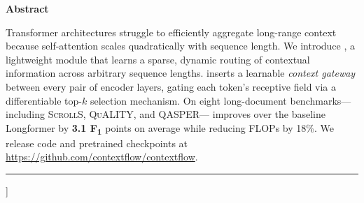 \documentclass[10pt,twocolumn]{article}
\begin{document}
{\begin{@twocolumnfalse}
  \vspace{8pt}
  \begin{center}
    {\small\bfseries\color{accent} Abstract}
  \end{center}
  \begin{small}
  \noindent
  Transformer architectures struggle to efficiently aggregate long-range context
  because self-attention scales quadratically with sequence length. We introduce
  \modelname{}, a lightweight module that learns a sparse, dynamic routing of
  contextual information across arbitrary sequence lengths. \modelname{} inserts
  a learnable \emph{context gateway} between every pair of encoder layers,
  gating each token's receptive field via a differentiable top-$k$ selection
  mechanism. On eight long-document benchmarks---including \textsc{ScrollS},
  \textsc{QuALITY}, and \textsc{QASPER}---\modelname{} improves over the
  baseline Longformer by \textbf{3.1 F\textsubscript{1}} points on average while
  reducing FLOPs by 18\%. We release code and pretrained checkpoints at
  \url{https://github.com/contextflow/contextflow}.
  \end{small}

  \vspace{10pt}
  \noindent\color{rule}\rule{\linewidth}{0.8pt}
  \vspace{12pt}

\end{@twocolumnfalse}%
}]








\end{document}
